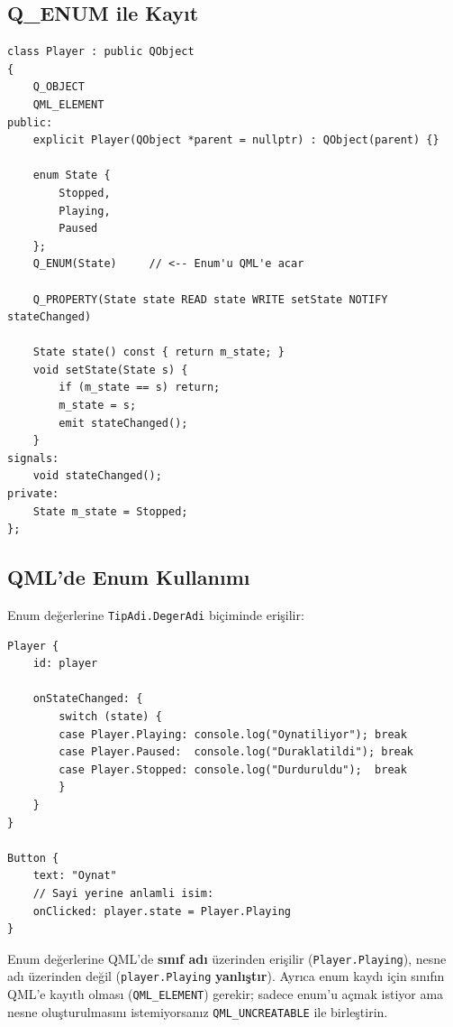 \documentclass[11pt,a4paper]{article}
\newcommand{\kod}[1]{\texttt{\color{koyuGri}#1}}
\begin{document}
\subsection{Q\_ENUM ile Kayıt}

\begin{lstlisting}
class Player : public QObject
{
    Q_OBJECT
    QML_ELEMENT
public:
    explicit Player(QObject *parent = nullptr) : QObject(parent) {}

    enum State {
        Stopped,
        Playing,
        Paused
    };
    Q_ENUM(State)     // <-- Enum'u QML'e acar

    Q_PROPERTY(State state READ state WRITE setState NOTIFY stateChanged)

    State state() const { return m_state; }
    void setState(State s) {
        if (m_state == s) return;
        m_state = s;
        emit stateChanged();
    }
signals:
    void stateChanged();
private:
    State m_state = Stopped;
};
\end{lstlisting}

\subsection{QML'de Enum Kullanımı}

Enum değerlerine \kod{TipAdi.DegerAdi} biçiminde erişilir:

\begin{lstlisting}[style=qmlstyle]
Player {
    id: player

    onStateChanged: {
        switch (state) {
        case Player.Playing: console.log("Oynatiliyor"); break
        case Player.Paused:  console.log("Duraklatildi"); break
        case Player.Stopped: console.log("Durduruldu");  break
        }
    }
}

Button {
    text: "Oynat"
    // Sayi yerine anlamli isim:
    onClicked: player.state = Player.Playing
}
\end{lstlisting}

\begin{uyarikutu}
Enum değerlerine QML'de \textbf{sınıf adı} üzerinden erişilir (\kod{Player.Playing}),
nesne adı üzerinden değil (\kod{player.Playing} \textbf{yanlıştır}). Ayrıca enum
kaydı için sınıfın QML'e kayıtlı olması (\kod{QML\_ELEMENT}) gerekir; sadece
enum'u açmak istiyor ama nesne oluşturulmasını istemiyorsanız
\kod{QML\_UNCREATABLE} ile birleştirin.
\end{uyarikutu}

\end{document}
